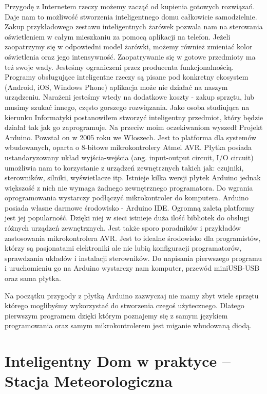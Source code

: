 \documentclass[brudnopis]{xmgr}
\begin{document}
Przygodę z Internetem rzeczy możemy zacząć od kupienia gotowych rozwiązań. Daje nam to możliwość stworzenia inteligentnego domu całkowicie samodzielnie. Zakup przykładowego zestawu inteligentnych żarówek pozwala nam na sterowania oświetleniem w całym mieszkaniu za pomocą aplikacji na telefon. Jeżeli zaopatrzymy się w odpowiedni model żarówki, możemy również zmieniać kolor oświetlenia oraz jego intensywność. 
Zaopatrywanie się w gotowe przedmioty ma też swoje wady. Jesteśmy ograniczeni przez producenta funkcjonalnością. Programy obsługujące inteligentne rzeczy są pisane pod konkretny ekosystem (Android, iOS, Windows Phone) aplikacja może nie działać na naszym urządzeniu. Narażeni jesteśmy wtedy na dodatkowe koszty - zakup sprzętu, lub musimy szukać innego, często gorszego rozwiązania. Jako osoba studiująca na kierunku Informatyki postanowiłem stworzyć inteligentny przedmiot, który będzie działał tak jak go zaprogramuje. 
Na przeciw moim oczekiwaniom wyszedł Projekt Arduino. Powstał on w 2005 roku we Włoszech. Jest to platforma dla systemów wbudowanych, oparta o 8-bitowe mikrokontrolery Atmel AVR. Płytka posiada ustandaryzowany układ wyjścia-wejścia (ang. input-output circuit, I/O circuit) umożliwia nam  to korzystanie z urządzeń zewnętrznych takich jak: czujniki, sterowników, silniki, wyświetlacze itp. Istnieje kilka wersji płytek Arduino jednak większość z nich nie wymaga żadnego zewnętrznego programatora. Do wgrania oprogramowania wystarczy podłączyć mikrokontroler do komputera. Arduino posiada własne darmowe środowisko - Arduino IDE. Ogromną zaletą platformy jest jej popularność. Dzięki niej w sieci istnieje duża ilość bibliotek do obsługi różnych urządzeń zewnętrznych. Jest także sporo poradników i przykładów zastosowania mikrokontrolera AVR.
Jest to idealne środowisko dla programistów, którzy są pasjonatami elektroniki ale nie lubią konfiguracji programatorów, sprawdzania układów i instalacji sterowników. Do napisania pierwszego programu i uruchomieniu go na Arduino wystarczy nam komputer, przewód miniUSB-USB oraz sama płytka. 

Na początku przygody z płytką Arduino zazwyczaj nie mamy zbyt wiele sprzętu którego moglibyśmy wykorzystać do stworzenia czegoś użytecznego. Dlatego pierwszym programem dzięki którym poznajemy się z samym językiem programowania oraz samym mikrokontrolerem jest miganie wbudowaną diodą.


\section{Inteligentny Dom w praktyce – Stacja Meteorologiczna}
\end{document}

